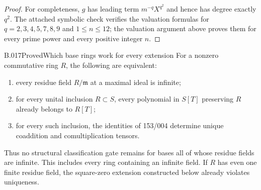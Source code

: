 \begin{proof}
For completeness, $g$ has leading term $m^{-q}X^{q^2}$ and hence
has degree exactly $q^2$. The attached symbolic check verifies the
valuation formulas for $q=2,3,4,5,7,8,9$ and $1\le n\le12$;
the valuation argument above proves them for every prime power
and every positive integer $n$.
\end{proof}

\begin{saresult}{B.017}{Proved}{Which base rings work for every extension}
For a nonzero commutative ring $R$, the following are equivalent:
\begin{enumerate}
\item every residue field $R/\mathfrak m$ at a maximal ideal is infinite;
\item for every unital inclusion $R\subset S$, every polynomial in
$S[T]$ preserving $R$ already belongs to $R[T]$;
\item for every such inclusion, the identities of 153/004 determine
unique coaddition and comultiplication tensors.
\end{enumerate}
Thus no structural classification gate remains for bases all of whose
residue fields are infinite. This includes every ring containing an
infinite field. If $R$ has even one finite residue field, the square-zero
extension constructed below already violates uniqueness.
\end{saresult}
